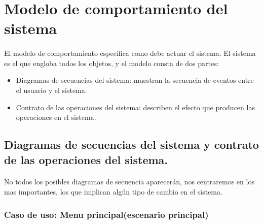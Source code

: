 \section{Modelo de comportamiento del sistema}

\paragraph{}
El modelo de comportamiento especifica como debe actuar el sistema. El sistema es el que engloba todos los objetos, y el modelo
consta de dos partes:

\begin{itemize}
    \item Diagramas de secuencias del sistema: muestran la secuencia de eventos entre el usuario y el sistema.
    \item Contrato de las operaciones del sistema: describen el efecto que producen las operaciones en el sistema.
\end{itemize}

\subsection{Diagramas de secuencias del sistema y contrato de las operaciones del sistema.}

\paragraph{}
No todos los posibles diagramas de secuencia aparecerán, nos centraremos en los mas importantes, los que implican algún tipo de 
cambio en el sistema.

\subsubsection{Caso de uso: Menu principal(escenario principal)}
